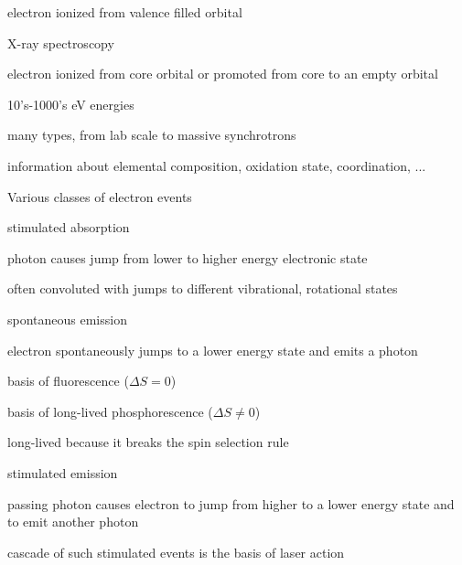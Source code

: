 \message{ !name(Outline.tex)}\documentclass[11pt]{article}
\begin{document}
\begin{outline}
\begin{outline}
\begin{outline}
\begin{outline}
        \item electron ionized from valence filled orbital          
        \end{outline}
      \item X-ray spectroscopy
        \begin{outline}
        \item electron ionized from core orbital or promoted from core to an empty orbital 
        \item 10’s-1000’s eV energies
        \item many types, from lab scale to massive synchrotrons
        \item information about elemental composition, oxidation state, coordination, ...          
        \end{outline}
      \end{outline}

    \item Various classes of electron events
      \begin{outline}
      \item stimulated absorption
        \begin{outline}
        \item photon causes jump from lower to higher energy electronic state
        \item often convoluted with jumps to different vibrational, rotational states          
        \end{outline}
      \item spontaneous emission
        \begin{outline}
        \item electron spontaneously jumps to a lower energy state and emits a photon
        \item basis of fluorescence ($\Delta S = 0$)
        \item basis of long-lived phosphorescence ($\Delta S \neq  0$)
        \item long-lived because it breaks the spin selection rule
        \end{outline}
      \item stimulated emission
        \begin{outline}
        \item passing photon causes electron to jump from higher to a lower energy state and to emit another photon
        \item cascade of such stimulated events is the basis of laser action
        \end{outline}
      \end{outline}
    \end{outline}


\end{outline}
\end{document}
